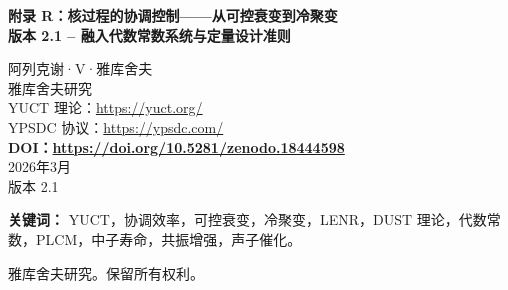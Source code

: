 \documentclass[12pt]{article}
\theoremstyle{remark}
\newcommand{\Keff}{K_{\mathrm{eff}}}
\newcommand{\df}{d_{\!f}}
\newcommand{\Kcrit}{K_{\mathrm{crit}}}
\newcommand{\Sodd}{S_{\mathrm{odd}}}
\newcommand{\Seven}{S_{\mathrm{even}}}
\begin{document}
	
	\begin{titlepage}
		\begin{center}
			\vspace*{0cm}
			
			\Huge\textbf{附录 R：核过程的协调控制——从可控衰变到冷聚变} \\
			\vspace{0.5cm}
			\Large\textbf{版本 2.1 – 融入代数常数系统与定量设计准则}
			\vspace{2cm}
			
			\large 阿列克谢·V·雅库舍夫\\
			雅库舍夫研究\\
			YUCT 理论：\url{https://yuct.org/}\\
			YPSDC 协议：\url{https://ypsdc.com/}\\
			\vspace{1cm}
			\textbf{DOI：\url{https://doi.org/10.5281/zenodo.18444598}}\\
			\vspace{1cm}
			2026年3月 \\ \large 版本 2.1
			\newpage
			\begin{abstract}
				\noindent
				本附录将雅库舍夫统一协调理论（YUCT）扩展到核与亚核过程。从普适误差标度律 \(\varepsilon = \kappa_c \alpha \Keff^{-\beta}\)（其中 \(\beta = 2/3\)，\(\kappa_c = 1/3\)）出发，我们推导了在外场和共振激发下衰变率、隧穿概率以及聚变截面的修正。一个中心结果是低能核反应（LENR，冷聚变）的临界条件：\(\Keff > \Kcrit = (E_{\text{Coulomb}}/E_{\text{coord}})^{\df}\)。利用最近推导的代数常数系统 \(\beta = 2/3\)，\(\Sodd = 6/5 = 1.2\)，\(\Seven = 4/5 = 0.8\) 及其关系 \(\Sodd+\Seven=2\)，\(\Sodd/\Seven = 1/\beta = 3/2\)，我们获得了定量设计准则：相干（单向）关联的比例必须超过 60\%，且相干响应与非相干响应的幅度比必须接近 1.5。这些准则将 LENR 从推测性搜索转变为具有可测量目标的工程任务。我们展示了这些常数与协调物质周期拉格朗日量（PLCM）如何实现系统性材料筛选和闭环控制。讨论了与独立框架（DUST）以及现有实验线索（异常屏蔽、核同质异能素）的一致性。提出了一个分阶段路线图，并给出了现实概率估计（5-10 年内成功概率 30-40\%）。
			\end{abstract}
			
			\vspace{0.3cm}
			
			\noindent
			\small\textbf{关键词：} YUCT，协调效率，可控衰变，冷聚变，LENR，DUST 理论，代数常数，PLCM，中子寿命，共振增强，声子催化。
			
			\vspace{0.1cm}
			
			\noindent
			 雅库舍夫研究。保留所有权利。
		\end{center}
	\end{titlepage}
	
\end{document}
